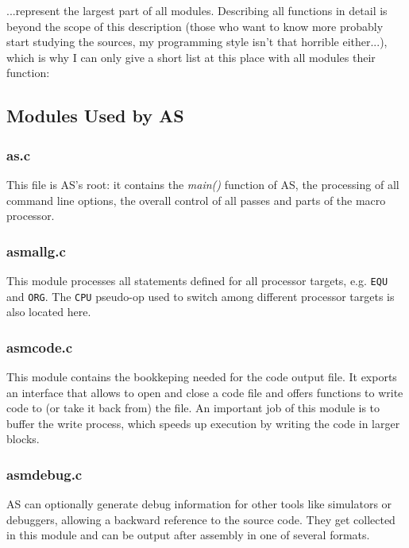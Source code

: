 \documentclass[12pt,twoside]{report}
\newcommand{\tty}[1]{{\tt #1}}
\begin{document}
...represent the largest part of all modules.  Describing all functions in
detail is beyond the scope of this description (those who want to know
more probably start studying the sources, my programming style isn't that
horrible either...), which is why I can only give a short list at this
place with all modules their function:

\subsection{Modules Used by AS}

\subsubsection{as.c}

This file is AS's root: it contains the {\em main()} function of AS, the
processing of all command line options, the overall control of all passes
and parts of the macro processor.

\subsubsection{asmallg.c}

This module processes all statements defined for all processor targets,
e.g. \tty{EQU} and \tty{ORG}.  The \tty{CPU} pseudo-op used to switch
among different processor targets is also located here.

\subsubsection{asmcode.c}

This module contains the bookkeping needed for the code output file.  It
exports an interface that allows to open and close a code file and offers
functions to write code to (or take it back from) the file.  An important
job of this module is to buffer the write process, which speeds up
execution by writing the code in larger blocks.

\subsubsection{asmdebug.c}

AS can optionally generate debug information for other tools like
simulators or debuggers, allowing a backward reference to the source code.
They get collected in this module and can be output after assembly in one
of several formats.
\end{document}
